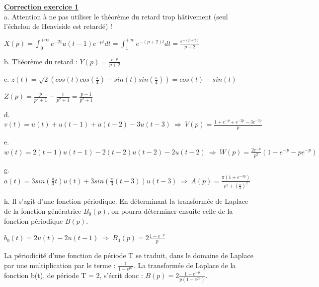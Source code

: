 \documentclass[11pt]{report}
\begin{document}
	
	
	\vspace{1\baselineskip}
	
	\textbf{\underline{Correction exercice 1}}\\
	a. Attention à ne pas utiliser le théorème du retard trop hâtivement (seul l'échelon de Heaviside est retardé) !
	
	$X(p) = \int_{0}^{+\infty} e^{-2t}u(t-1)e^{-pt}dt=\int_{1}^{+\infty} e^{-(p+2)t}dt=\frac{e^{-(p+2)}}{p+2}$
	
	\vspace{0.5\baselineskip}
	
	b. Théorème du retard : $Y(p) = \frac{e^{-p}}{p+2}$
	
	\vspace{0.5\baselineskip}
	
	c. $z(t) = \sqrt{2}(cos(t)cos(\frac{\pi}{4})-sin(t)sin(\frac{\pi}{4}))=cos(t)-sin(t)$
	
	$Z(p) = \frac{p}{p^{2}+1}-\frac{1}{p^{2}+1}=\frac{p-1}{p^{2}+1}$
	
	\vspace{0.5\baselineskip}
	
	d. $v(t) = u(t)+u(t-1)+u(t-2)-3u(t-3)~\Rightarrow~V(p)=\frac{1+e^{-p}+e^{-2p}-3e^{-3p}}{p}$ 
	
	\vspace{0.5\baselineskip}
	
	e. $w(t) = 2(t-1)u(t-1)-2(t-2)u(t-2)-2u(t-2)~\Rightarrow~W(p)=\frac{2e^{-p}}{p^{2}}(1-e^{-p}-pe^{-p})$ 
	
	\vspace{0.5\baselineskip}
	
	g. $a(t)=3sin(\frac{\pi}{3}t)u(t)+3sin(\frac{\pi}{3}(t-3))u(t-3)~\Rightarrow~A(p)=\frac{\pi(1+e^{-3p})}{p^{2}+(\frac{\pi}{3})^{2}}$
	
	\vspace{0.5\baselineskip}
	
	h. Il s'agit d'une fonction périodique. En déterminant la transformée de Laplace de la fonction génératrice $B_{0}(p)$, on pourra déterminer ensuite celle de la fonction périodique $B(p)$.
	
	$b_{0}(t)=2u(t)-2u(t-1)~\Rightarrow~B_{0}(p)=2\frac{1-e^{-p}}{p}$
	
	La périodicité d'une fonction de période T se traduit, dans le domaine de Laplace par une multiplication par le terme : $\frac{1}{1-e^{pT}}$. La transformée de Laplace de la fonction b(t), de période T = 2, s'écrit donc : $B(p) =2\frac{1-e^{-p}}{p(1-e^{2p})} $.
	
\end{document}
